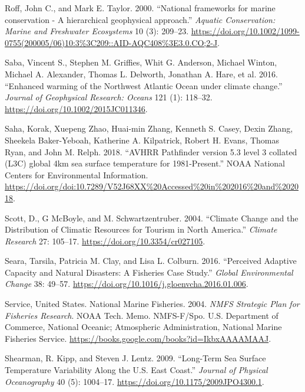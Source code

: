 \documentclass[
]{book}
\newlength{\cslhangindent}
\newenvironment{cslreferences}%
  {\setlength{\parindent}{0pt}%
  \everypar{\setlength{\hangindent}{\cslhangindent}}\ignorespaces}%
  {\par}
\begin{document}
\begin{cslreferences}
\leavevmode\hypertarget{ref-Roff2000}{}%
Roff, John C., and Mark E. Taylor. 2000. ``National frameworks for marine conservation - A hierarchical geophysical approach.'' \emph{Aquatic Conservation: Marine and Freshwater Ecosystems} 10 (3): 209--23. \url{https://doi.org/10.1002/1099-0755(200005/06)10:3\%3C209::AID-AQC408\%3E3.0.CO;2-J}.

\leavevmode\hypertarget{ref-Saba2016}{}%
Saba, Vincent S., Stephen M. Griffies, Whit G. Anderson, Michael Winton, Michael A. Alexander, Thomas L. Delworth, Jonathan A. Hare, et al. 2016. ``Enhanced warming of the Northwest Atlantic Ocean under climate change.'' \emph{Journal of Geophysical Research: Oceans} 121 (1): 118--32. \url{https://doi.org/10.1002/2015JC011346}.

\leavevmode\hypertarget{ref-Saha2018}{}%
Saha, Korak, Xuepeng Zhao, Huai-min Zhang, Kenneth S. Casey, Dexin Zhang, Sheekela Baker-Yeboah, Katherine A. Kilpatrick, Robert H. Evans, Thomas Ryan, and John M. Relph. 2018. ``AVHRR Pathfinder version 5.3 level 3 collated (L3C) global 4km sea surface temperature for 1981-Present.'' NOAA National Centers for Environmental Information. \url{https://doi.org/doi:10.7289/V52J68XX\%20Accessed\%20in\%202016\%20and\%202018}.

\leavevmode\hypertarget{ref-scott_climate_2004}{}%
Scott, D., G McBoyle, and M. Schwartzentruber. 2004. ``Climate Change and the Distribution of Climatic Resources for Tourism in North America.'' \emph{Climate Research} 27: 105--17. \url{https://doi.org/10.3354/cr027105}.

\leavevmode\hypertarget{ref-seara_perceived_2016}{}%
Seara, Tarsila, Patricia M. Clay, and Lisa L. Colburn. 2016. ``Perceived Adaptive Capacity and Natural Disasters: A Fisheries Case Study.'' \emph{Global Environmental Change} 38: 49--57. \url{https://doi.org/10.1016/j.gloenvcha.2016.01.006}.

\leavevmode\hypertarget{ref-nmfs2004}{}%
Service, United States. National Marine Fisheries. 2004. \emph{NMFS Strategic Plan for Fisheries Research}. NOAA Tech. Memo. NMFS-F/Spo. U.S. Department of Commerce, National Oceanic; Atmospheric Administration, National Marine Fisheries Service. \url{https://books.google.com/books?id=IkbxAAAAMAAJ}.

\leavevmode\hypertarget{ref-shearman_long-term_2009}{}%
Shearman, R. Kipp, and Steven J. Lentz. 2009. ``Long-Term Sea Surface Temperature Variability Along the U.S. East Coast.'' \emph{Journal of Physical Oceanography} 40 (5): 1004--17. \url{https://doi.org/10.1175/2009JPO4300.1}.


\end{cslreferences}
\end{document}
